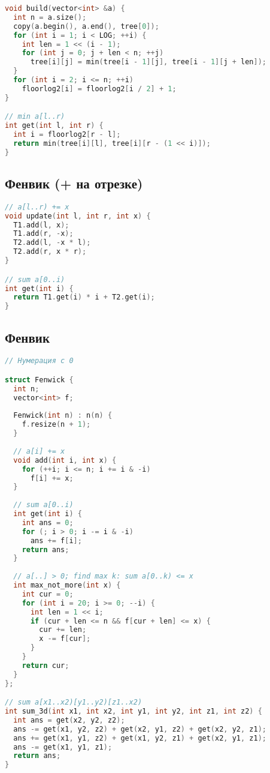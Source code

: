 \documentclass[9pt,a4paper,landscape,twosided]{extarticle}
\begin{document}
\begin{multicols*}{3}
\begin{lstlisting}[language=C++]
void build(vector<int> &a) {
  int n = a.size();
  copy(a.begin(), a.end(), tree[0]);
  for (int i = 1; i < LOG; ++i) {
    int len = 1 << (i - 1);
    for (int j = 0; j + len < n; ++j)
      tree[i][j] = min(tree[i - 1][j], tree[i - 1][j + len]);
  }
  for (int i = 2; i <= n; ++i)
    floorlog2[i] = floorlog2[i / 2] + 1;
}

// min a[l..r)
int get(int l, int r) {
  int i = floorlog2[r - l];
  return min(tree[i][l], tree[i][r - (1 << i)]);
}

\end{lstlisting}

\subsection{Фенвик (+ на отрезке)}
\begin{lstlisting}[language=C++]
// a[l..r) += x
void update(int l, int r, int x) {
  T1.add(l, x);
  T1.add(r, -x);
  T2.add(l, -x * l);
  T2.add(r, x * r);
}

// sum a[0..i)
int get(int i) {
  return T1.get(i) * i + T2.get(i);
}

\end{lstlisting}

\subsection{Фенвик}
\begin{lstlisting}[language=C++]
// Нумерация с 0

struct Fenwick {
  int n;
  vector<int> f;
 
  Fenwick(int n) : n(n) {
    f.resize(n + 1);
  }
 
  // a[i] += x
  void add(int i, int x) {
    for (++i; i <= n; i += i & -i)
      f[i] += x;
  }
 
  // sum a[0..i)
  int get(int i) {
    int ans = 0;
    for (; i > 0; i -= i & -i)
      ans += f[i];
    return ans;
  }
 
  // a[..] > 0; find max k: sum a[0..k) <= x
  int max_not_more(int x) {
    int cur = 0;
    for (int i = 20; i >= 0; --i) {
      int len = 1 << i;
      if (cur + len <= n && f[cur + len] <= x) {
        cur += len;
        x -= f[cur];
      }
    }
    return cur;
  }
};

// sum a[x1..x2)[y1..y2)[z1..x2)
int sum_3d(int x1, int x2, int y1, int y2, int z1, int z2) {
  int ans = get(x2, y2, z2);
  ans -= get(x1, y2, z2) + get(x2, y1, z2) + get(x2, y2, z1);
  ans += get(x1, y1, z2) + get(x1, y2, z1) + get(x2, y1, z1);
  ans -= get(x1, y1, z1);
  return ans;
}
\end{lstlisting}


\end{multicols*}
\end{document}
